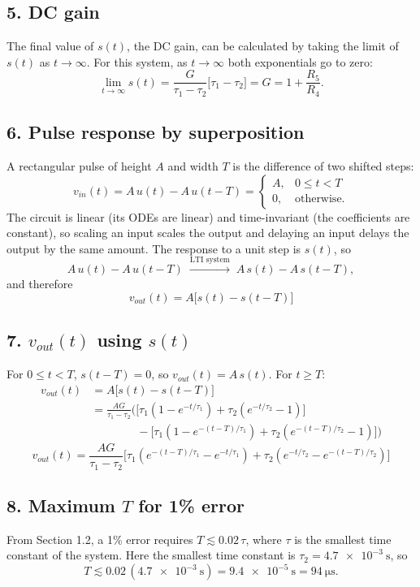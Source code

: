 \documentclass[12pt]{article}
\begin{document}
\subsection*{5. DC gain}
The final value of $s(t)$, the DC gain, can be calculated by taking the limit of $s(t)$ as $t\to\infty$.
For this system, as $t \to \infty$ both exponentials go to zero:
\[
\lim_{t\to\infty}s(t) = \frac{G}{\tau_1 - \tau_2}\big[\tau_1 - \tau_2\big] = \boxed{G = 1 + \frac{R_5}{R_4}}.
\]

\subsection*{6. Pulse response by superposition}
A rectangular pulse of height $A$ and width $T$ is the difference of two shifted steps:
\[
v_{in}(t) = A\,u(t) - A\,u(t-T) =
\begin{cases}
A, & 0 \le t < T \\
0, & \text{otherwise.}
\end{cases}
\]
The circuit is linear (its ODEs are linear) and time-invariant (the coefficients are constant), so scaling an input scales the output and delaying an input delays the output by the same amount. The response to a unit step is $s(t)$, so
\[
A\,u(t) - A\,u(t-T) \;\xrightarrow{\text{LTI system}}\; A\,s(t) - A\,s(t-T),
\]
and therefore
\[
\boxed{v_{out}(t) = A\big[s(t) - s(t-T)\big]}
\]

\subsection*{7. $v_{out}(t)$ using $s(t)$}
For $0 \le t < T$, $s(t-T) = 0$, so $v_{out}(t) = A\,s(t)$. For $t \ge T$:
\begin{align*}
v_{out}(t) &= A\big[s(t) - s(t-T)\big] \\
&= \frac{AG}{\tau_1 - \tau_2}\Big(\big[\tau_1(1 - e^{-t/\tau_1}) + \tau_2(e^{-t/\tau_2} - 1)\big] \\
&\qquad\qquad - \big[\tau_1(1 - e^{-(t-T)/\tau_1}) + \tau_2(e^{-(t-T)/\tau_2} - 1)\big]\Big)
\end{align*}
\[
\boxed{v_{out}(t) = \frac{AG}{\tau_1 - \tau_2}\Big[\tau_1\left(e^{-(t-T)/\tau_1} - e^{-t/\tau_1}\right) + \tau_2\left(e^{-t/\tau_2} - e^{-(t-T)/\tau_2}\right)\Big]}
\]

\subsection*{8. Maximum $T$ for 1\% error}
From Section 1.2, a 1\% error requires $T \lesssim 0.02\,\tau$, where $\tau$ is the smallest time constant of the system. Here the smallest time constant is $\tau_2 = \SI{4.7e-3}{\second}$, so
\[
T \lesssim 0.02\,(\SI{4.7e-3}{\second}) = \SI{9.4e-5}{\second} = \boxed{\SI{94}{\micro\second}}.
\]
\end{document}
